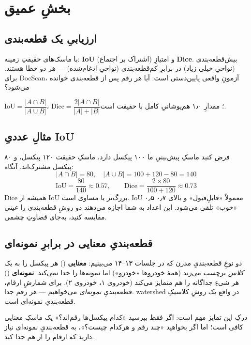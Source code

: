 \documentclass[12pt,a4paper]{article}
\begin{document}
\section{بخشِ عمیق}

\subsection{ارزیابیِ یک قطعه‌بندی}

با ماسک‌های حقیقتِ زمینه: \textbf{IoU} (اشتراک بر اجتماع) و امتیازِ \textbf{Dice}. بیش‌قطعه‌بندی
(نواحیِ خیلی زیاد) در برابرِ کم‌قطعه‌بندی (نواحیِ ادغام‌شده) — هر دو خطا هستند. برای DocScan، آزمونِ
واقعی پایین‌دستی است: آیا هر رقم پس از قطعه‌بندی خوانده می‌شود؟

\begin{riyazi}
$\mathrm{IoU}=\dfrac{|A\cap B|}{|A\cup B|}$، $\mathrm{Dice}=\dfrac{2|A\cap B|}{|A|+|B|}$؛
مقدارِ ۱٫۰ هم‌پوشانیِ کامل با حقیقت است.
\end{riyazi}

\subsection{مثالِ عددیِ IoU}

فرض کنید ماسکِ پیش‌بینیِ ما ۱۰۰ پیکسل دارد، ماسکِ حقیقت ۱۲۰ پیکسل، و ۸۰ پیکسل مشترک‌اند. آنگاه:
\[
|A \cap B| = 80, \quad |A \cup B| = 100 + 120 - 80 = 140
\]
\[
\mathrm{IoU} = \frac{80}{140} \approx 0.57, \qquad \mathrm{Dice} = \frac{2 \times 80}{100 + 120} \approx 0.73
\]
Dice همیشه از IoU بزرگ‌تر یا مساوی است. IoUِ ۰٫۵ معمولاً «قابلِ‌قبول» و بالای ۰٫۷ «خوب» تلقی
می‌شود. این اعداد به شما اجازه می‌دهند دو روشِ قطعه‌بندی را \emph{عینی} مقایسه کنید، به‌جای قضاوتِ چشمی.

\subsection{قطعه‌بندیِ معنایی در برابرِ نمونه‌ای}

دو نوعِ قطعه‌بندیِ مدرن که در جلسات ۱۳–۱۴ می‌بینیم: \textbf{معنایی} () هر پیکسل را
به یک \emph{کلاس} برچسب می‌زند (همهٔ خودروها «خودرو») اما نمونه‌ها را جدا نمی‌کند. \textbf{نمونه‌ای}
() هر شیءِ جداگانه را هم متمایز می‌کند (خودروی ۱، خودروی ۲). برای شمارشِ ارقام،
قطعه‌بندیِ \emph{نمونه‌ای} می‌خواهیم — هر رقم جدا. watershed در واقع یک روشِ کلاسیکِ قطعه‌بندیِ
نمونه‌ای است.

\begin{yaddasht}
درکِ این تمایز مهم است: اگر فقط بپرسید «کدام پیکسل‌ها رقم‌اند؟» یک ماسکِ معنایی کافی است؛ اما اگر
بخواهید «چند رقم و هرکدام چیست؟»، به قطعه‌بندیِ نمونه‌ای نیاز دارید که ارقام را از هم جدا کند.
\end{yaddasht}
\end{document}
